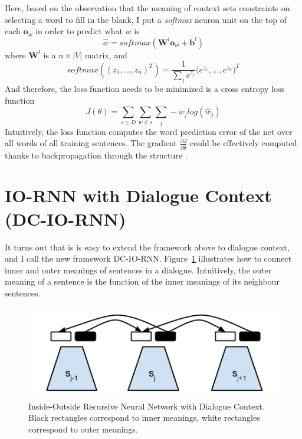 \documentclass[10pt]{article}
\begin{document}
Here, based on the observation that the meaning of context sets constraints on 
selecting a word to fill in the blank, I put a \textit{softmax} neuron unit on the top 
of each $\mathbf{o}_w$ in order to predict what $w$ is
\begin{equation}
	\hat{w} = softmax(\mathbf{W}^l \mathbf{o}_w + \mathbf{b}^l)
\end{equation}
where $\mathbf{W}^l$ is a $n \times |V|$ matrix, and 
\begin{equation}
	softmax((z_1,...,z_n)^T) = \frac{1}{\sum_j e^{z_j}} \big( e^{z_1},..., e^{z_n} \big)^T
\end{equation}
And therefore, the loss function needs to be minimized is a cross entropy loss function 
\begin{equation}
	J(\theta) = \sum_{s \in D} \sum_{w \in s} \sum_j -w_j log(\hat{w}_j)
\end{equation}
Intuitively, the loss function computes the word prediction error of the net over all 
words of all training sentences. 
The gradient $\frac{\partial J}{\partial \theta}$ could be effectively computed 
thanks to backpropagation through the structure \citep{goller_learning_1996}.


\section{IO-RNN with Dialogue Context (DC-IO-RNN)}
\label{section dciornn}
It turns out that is is easy to extend the framework above to dialogue context, and 
I call the new framework DC-IO-RNN.
Figure~\ref{figure dciornn} illustrates how to connect inner and outer meanings 
of sentences in a dialogue. Intuitively, the outer meaning of a sentence is 
the function of the inner meanings of its neighbour sentences. 

\begin{figure}[h!]
	\center
	\includegraphics[scale=0.5]{DC-IO-RNN.png}
	\caption{Inside-Outside Recursive Neural Network with Dialogue Context. 
	Black rectangles correspond to inner meanings, 
	white rectangles correspond to outer meanings.}
	\label{figure dciornn}
\end{figure}
\end{document}
